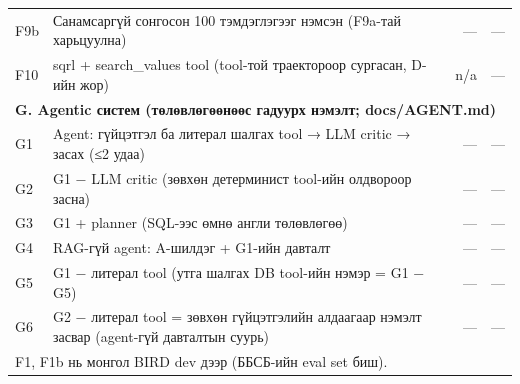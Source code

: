 \begin{small}
\begin{longtable}{p{1.0cm}p{7.6cm}rr}
F9b & Санамсаргүй сонгосон 100 тэмдэглэгээг нэмсэн (F9a-тай харьцуулна) & — & — \\
F10 & sqrl + search\_values tool (tool-той траектороор сургасан, D-ийн жор) & n/a & — \\
\multicolumn{4}{l}{\textbf{G. Agentic систем (төлөвлөгөөнөөс гадуурх нэмэлт; docs/AGENT.md)}}\\
G1 & Agent: гүйцэтгэл ба литерал шалгах tool → LLM critic → засах (≤2 удаа) & — & — \\
G2 & G1 − LLM critic (зөвхөн детерминист tool-ийн олдвороор засна) & — & — \\
G3 & G1 + planner (SQL-ээс өмнө англи төлөвлөгөө) & — & — \\
G4 & RAG-гүй agent: A-шилдэг + G1-ийн давталт & — & — \\
G5 & G1 − литерал tool (утга шалгах DB tool-ийн нэмэр = G1 − G5) & — & — \\
G6 & G2 − литерал tool = зөвхөн гүйцэтгэлийн алдаагаар нэмэлт засвар (agent-гүй давталтын суурь) & — & — \\
\bottomrule
\multicolumn{4}{p{13.4cm}}{\footnotesize F1, F1b нь монгол BIRD dev дээр (ББСБ-ийн eval set биш).}\\
\end{longtable}
\end{small}
